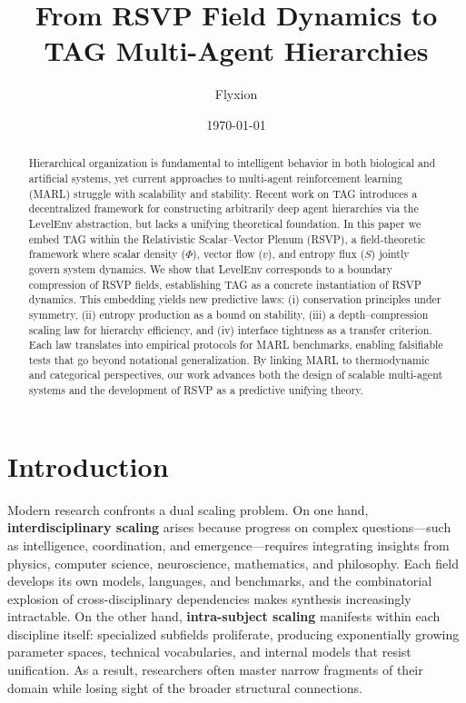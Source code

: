 \documentclass[11pt,a4paper]{article}
\title{From RSVP Field Dynamics to TAG Multi-Agent Hierarchies}
\author{Flyxion}
\date{\today}
\begin{document}
\maketitle

\begin{abstract}
Hierarchical organization is fundamental to intelligent behavior in both
biological and artificial systems, yet current approaches to multi-agent
reinforcement learning (MARL) struggle with scalability and stability. Recent
work on TAG introduces a decentralized framework for constructing arbitrarily
deep agent hierarchies via the LevelEnv abstraction, but lacks a unifying
theoretical foundation. In this paper we embed TAG within the Relativistic
Scalar–Vector Plenum (RSVP), a field-theoretic framework where scalar density
($\Phi$), vector flow ($v$), and entropy flux ($S$) jointly govern system
dynamics. We show that LevelEnv corresponds to a boundary compression of RSVP
fields, establishing TAG as a concrete instantiation of RSVP dynamics. This
embedding yields new predictive laws: (i) conservation principles under
symmetry, (ii) entropy production as a bound on stability, (iii) a
depth–compression scaling law for hierarchy efficiency, and (iv) interface
tightness as a transfer criterion. Each law translates into empirical protocols
for MARL benchmarks, enabling falsifiable tests that go beyond notational
generalization. By linking MARL to thermodynamic and categorical perspectives,
our work advances both the design of scalable multi-agent systems and the
development of RSVP as a predictive unifying theory.
\end{abstract}

\section{Introduction}

Modern research confronts a dual scaling problem. On one hand,
\textbf{interdisciplinary scaling} arises because progress on complex
questions—such as intelligence, coordination, and emergence—requires
integrating insights from physics, computer science, neuroscience,
mathematics, and philosophy. Each field develops its own models, languages,
and benchmarks, and the combinatorial explosion of cross-disciplinary
dependencies makes synthesis increasingly intractable. On the other hand,
\textbf{intra-subject scaling} manifests within each discipline itself:
specialized subfields proliferate, producing exponentially growing parameter
spaces, technical vocabularies, and internal models that resist unification.
As a result, researchers often master narrow fragments of their domain while
losing sight of the broader structural connections.
\end{document}
